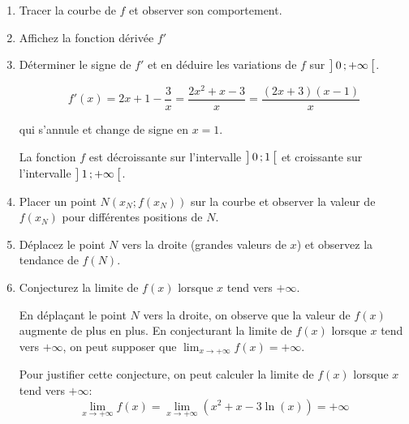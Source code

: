 \documentclass[11pt, a4paper]{report}
\begin{document}
\begin{enumerate}[resume]
    \item Tracer la courbe de $f$ et observer son comportement. 
    \item Affichez la fonction dérivée $f'$  
    \item Déterminer le signe de $f'$ et en déduire les variations de $f$ sur $\bigl] \, 0 \, ; +\infty \,\bigl[$. 
    \begin{blocvisible}[height=5]
        \begin{minipage}{0.58\linewidth}
            \[f'(x) = 2x + 1 - \dfrac{3}{x} = \dfrac{2x^2 + x - 3}{x} = \dfrac{(2x+3)(x-1)}{x}\] 
        
            qui s'annule et change de signe en $x=1$.

            La fonction $f$ est décroissante sur l'intervalle $\bigl] \, 0 \, ; 1 \,\bigl[$ et croissante sur l'intervalle $\bigl] \, 1 \, ; +\infty \,\bigl[$.
        \end{minipage}\hfill
        \begin{minipage}{0.4\linewidth}
\end{minipage}
    \end{blocvisible}
        
    
    \item Placer un point $N\left(x_N; f(x_N)\right)$ sur la courbe et observer la valeur de $f(x_N)$ pour différentes positions de $N$.        
    \item Déplacez le point $N$ vers la droite (grandes valeurs de $x$) et observez la tendance de $f(N)$. 
    \item Conjecturez la limite de $f(x)$ lorsque $x$ tend vers $+\infty$.  
    
    \begin{blocvisible}[height=3]
        En déplaçant le point $N$ vers la droite, on observe que la valeur de $f(x)$ augmente de plus en plus. En conjecturant la limite de $f(x)$ lorsque $x$ tend vers $+\infty$, on peut supposer que $\lim_{x \to +\infty} f(x) = +\infty$.

        Pour justifier cette conjecture, on peut calculer la limite de $f(x)$ lorsque $x$ tend vers $+\infty$:
        \[\lim_{x \to +\infty} f(x) = \lim_{x \to +\infty} (x^2 + x - 3\ln(x))=+\infty\]
    \end{blocvisible}
\end{enumerate}
\end{document}
